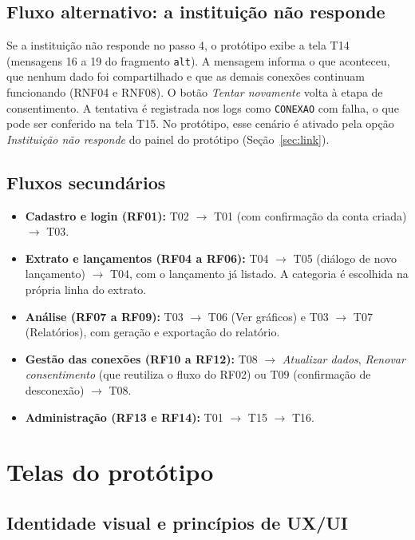 \documentclass[11pt,a4paper]{article}
\newcommand{\cls}[1]{\texttt{#1}}
\begin{document}
\subsection{Fluxo alternativo: a instituição não responde}\label{sec:fluxoalt}

Se a instituição não responde no passo 4, o protótipo exibe a tela T14 (mensagens 16 a 19 do fragmento \cls{alt}). A mensagem informa o que aconteceu, que nenhum dado foi compartilhado e que as demais conexões continuam funcionando (RNF04 e RNF08). O botão \emph{Tentar novamente} volta à etapa de consentimento. A tentativa é registrada nos logs como \cls{CONEXAO} com falha, o que pode ser conferido na tela T15. No protótipo, esse cenário é ativado pela opção \emph{Instituição não responde} do painel do protótipo (Seção~\ref{sec:link}).

\subsection{Fluxos secundários}

\begin{itemize}
\item \textbf{Cadastro e login (RF01):} T02 $\rightarrow$ T01 (com confirmação da conta criada) $\rightarrow$ T03.
\item \textbf{Extrato e lançamentos (RF04 a RF06):} T04 $\rightarrow$ T05 (diálogo de novo lançamento) $\rightarrow$ T04, com o lançamento já listado. A categoria é escolhida na própria linha do extrato.
\item \textbf{Análise (RF07 a RF09):} T03 $\rightarrow$ T06 (Ver gráficos) e T03 $\rightarrow$ T07 (Relatórios), com geração e exportação do relatório.
\item \textbf{Gestão das conexões (RF10 a RF12):} T08 $\rightarrow$ \emph{Atualizar dados}, \emph{Renovar consentimento} (que reutiliza o fluxo do RF02) ou T09 (confirmação de desconexão) $\rightarrow$ T08.
\item \textbf{Administração (RF13 e RF14):} T01 $\rightarrow$ T15 $\rightarrow$ T16.
\end{itemize}

\section{Telas do protótipo}

\subsection{Identidade visual e princípios de UX/UI}
\end{document}
